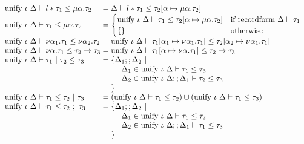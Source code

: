 \documentclass[sigplan,screen]{acmart}
\begin{document}
\begin{figure*}[h]
\[\begin{array}{l @{} l}
      \\
      \text{unify } \iota\ \Delta \vdash
      l * \tau_1 \leq \mu \alpha . \tau_2
      &{} = 
      \Delta \vdash  
      l * \tau_1 \leq\tau_2[\alpha\mapsto\mu\alpha.\tau_2]

      \\
      \text{unify } \iota\ \Delta \vdash
      \tau_1 \leq \mu \alpha . \tau_2
      &{} = 
      \begin{cases}  
        \text{unify } \iota\ \Delta \vdash 
        \tau_1 \leq \tau_2[\alpha\mapsto\mu\alpha.\tau_2]	
        &\text{if }
        \text{recordform } \Delta \vdash \tau_1
        \\
        \{\}
        &\text{otherwise}
      \end{cases}

      \\
      \text{unify } \iota\ \Delta \vdash
      \nu \alpha_1 . \tau_1 \leq 
      \nu \alpha_2 . \tau_2	
      &{} = 
      \text{unify } \iota\ \Delta \vdash 
      \tau_1[\alpha_1\mapsto\nu\alpha_1.\tau_1] \leq 
      \tau_2[\alpha_2\mapsto\nu\alpha_1.\tau_1]

      \\
      \text{unify } \iota\ \Delta \vdash
      \nu \alpha . \tau_1 \leq 
      \tau_2 \rightarrow \tau_3
      &{} = 
      \text{unify } \iota\ \Delta \vdash
      \tau_1[\alpha\mapsto\nu\alpha.\tau_1]
      \leq 
      \tau_2 \rightarrow \tau_3

      \\
      \text{unify } \iota\ \Delta \vdash
      \tau_1\ |\ \tau_2 \leq \tau_3
      &{} = 
      \begin{array}[t]{@{} l}
        \{\Delta_1;;\Delta_2\ |
        \\ 
        \ \ \ \ \Delta_1 \in \text{unify } \iota\ \Delta \vdash \tau_1 \leq \tau_3
        \\
        \ \ \ \ \Delta_2 \in \text{unify } \iota\ \Delta;;\Delta_1 \vdash \tau_2 \leq \tau_3
        \\
        \}
      \end{array}

      \\
      \text{unify } \iota\ \Delta \vdash
      \tau_1 \leq \tau_2 \ |\ \tau_3
      &{} = 
      (\text{unify } \iota\ \Delta \vdash \tau_1 \leq \tau_2)
      \cup
      (\text{unify } \iota\ \Delta \vdash \tau_1 \leq \tau_3)

      \\
      \text{unify } \iota\ \Delta \vdash
      \tau_1 \leq \tau_2\ ;\ \tau_3
      &{} = 
      \begin{array}[t]{@{} l}
        \{\Delta_1;;\Delta_2\ |
        \\ 
        \ \ \ \ \Delta_1 \in \text{unify } \iota\ \Delta \vdash \tau_1 \leq \tau_2
        \\
        \ \ \ \ \Delta_2 \in \text{unify } \iota\ \Delta;;\Delta_1 \vdash \tau_1 \leq \tau_3
        \\
        \}
      \end{array}


\end{array}\]
\end{figure*}
\end{document}

